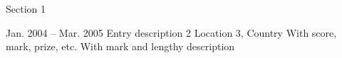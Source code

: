 \begin{cvsection}{Section 1}
\begin{cventries}
        \cventry
        {Jan. 2004 -- Mar. 2005}%
        {Entry description 2}%
        {Location 3, Country}%
        {With score, mark, prize, etc.}%
        {With mark and lengthy description}

    \end{cventries}

    
\end{cvsection}%